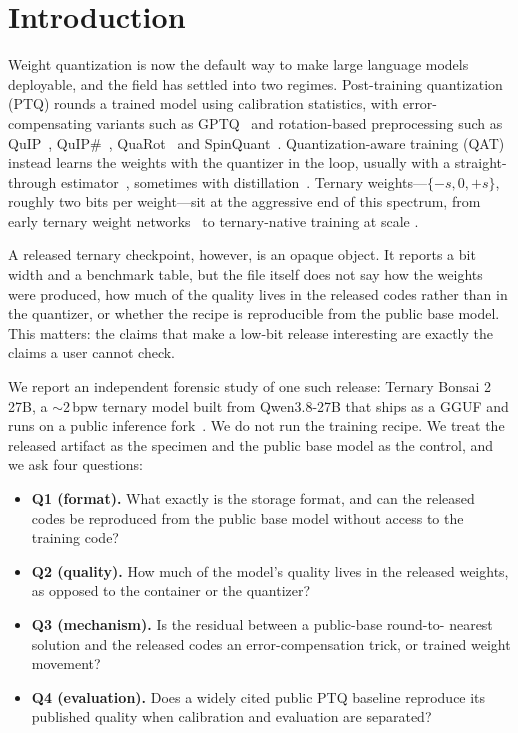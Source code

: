 \section{Introduction}
\label{sec:intro}

Weight quantization is now the default way to make large language models
deployable, and the field has settled into two regimes. Post-training
quantization (PTQ) rounds a trained model using calibration statistics, with
error-compensating variants such as GPTQ~\citep{gptq} and rotation-based
preprocessing such as QuIP~\citep{quip}, QuIP\#~\citep{quipsharp},
QuaRot~\citep{quarot} and SpinQuant~\citep{spinquant}. Quantization-aware
training (QAT) instead learns the weights with the quantizer in the loop,
usually with a straight-through estimator~\citep{ste}, sometimes with
distillation~\citep{kd}. Ternary weights---$\{-s, 0, +s\}$, roughly two bits
per weight---sit at the aggressive end of this spectrum, from early ternary
weight networks~\citep{twn} to ternary-native training at scale
\citep{bitnet158}.

A released ternary checkpoint, however, is an opaque object. It reports a bit
width and a benchmark table, but the file itself does not say how the weights
were produced, how much of the quality lives in the released codes rather than
in the quantizer, or whether the recipe is reproducible from the public base
model. This matters: the claims that make a low-bit release interesting are
exactly the claims a user cannot check.

We report an independent forensic study of one such release: Ternary
Bonsai 2 27B, a $\sim$2\,bpw ternary model built from Qwen3.8-27B that ships as
a GGUF and runs on a public inference fork~\citep{prismbonsai2,prismfork,
qwen38}. We do not run the training recipe. We treat the released artifact as
the specimen and the public base model as the control, and we ask four
questions:

\begin{itemize}
  \item \textbf{Q1 (format).} What exactly is the storage format, and can the
  released codes be reproduced from the public base model without access to the
  training code?
  \item \textbf{Q2 (quality).} How much of the model's quality lives in the
  released weights, as opposed to the container or the quantizer?
  \item \textbf{Q3 (mechanism).} Is the residual between a public-base round-to-
  nearest solution and the released codes an error-compensation trick, or
  trained weight movement?
  \item \textbf{Q4 (evaluation).} Does a widely cited public PTQ baseline
  reproduce its published quality when calibration and evaluation are
  separated?
\end{itemize}

